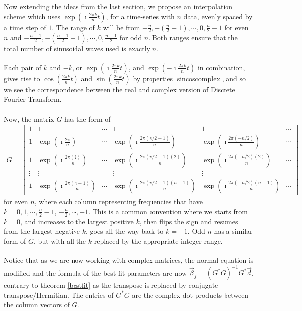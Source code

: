 Now extending the ideas from the last section, we propose an interpolation scheme which uses $\exp(\imath\frac{2\pi k}{n}t)$, for a time-series with $n$ data, evenly spaced by a time step of $1$. The range of $k$ will be from $-\frac{n}{2}, -(\frac{n}{2}-1), \cdots, 0, \frac{n}{2}-1$ for even $n$ and $-\frac{n-1}{2}, -(\frac{n-1}{2}-1), \cdots, 0, \frac{n-1}{2}$ for odd $n$. Both ranges ensure that the total number of sinusoidal waves used is exactly $n$.\\
\\
Each pair of $k$ and $-k$, or $\exp(\imath\frac{2\pi k}{n}t)$, and $\exp(-\imath\frac{2\pi k}{n}t)$ in combination, gives rise to $\cos(\frac{2\pi k}{n}t)$ and $\sin(\frac{2\pi k}{n}t)$ by properties \ref{sincoscomplex}, and so we see the correspondence between the real and complex version of Discrete Fourier Transform.\\
\\
Now, the matrix $G$ has the form of
\begin{align*}
G =
\begin{bmatrix}
1 & 1 & \cdots & 1 & 1 & \cdots\\
1 & \exp(\imath\frac{2\pi}{n}) & \cdots & \exp(\imath\frac{2\pi(n/2-1)}{n}) & \exp(\imath\frac{2\pi(-n/2)}{n}) & \cdots \\
1 & \exp(\imath\frac{2\pi(2)}{n}) & \cdots & \exp(\imath\frac{2\pi(n/2-1)(2)}{n}) & \exp(\imath\frac{2\pi(-n/2)(2)}{n}) & \cdots\\
\vdots & \vdots & & \vdots & \vdots & \\
1 & \exp(\imath\frac{2\pi(n-1)}{n}) & \cdots & \exp(\imath\frac{2\pi(n/2-1)(n-1)}{n}) & \exp(\imath\frac{2\pi(-n/2)(n-1)}{n}) & \cdots
\end{bmatrix}
\end{align*}
for even $n$, where each column representing frequencies that have $k = 0, 1, \cdots, \frac{n}{2}-1$, $-\frac{n}{2}, \cdots, -1$. This is a common convention where we starts from $k = 0$, and increases to the largest positive $k$, then flips the sign and resumes from the largest negative $k$, goes all the way back to $k = -1$. Odd $n$ has a similar form of $G$, but with all the $k$ replaced by the appropriate integer range.\\
\\
Notice that as we are now working with complex matrices, the normal equation is modified and the formula of the best-fit parameters are now $\vec{\beta}_f = (G^*G)^{-1}G^*\vec{d}$, contrary to theorem \ref{bestfit} as the transpose is replaced by conjugate transpose/Hermitian. The entries of $G^*G$ are the complex dot products between the column vectors of $G$.\\

